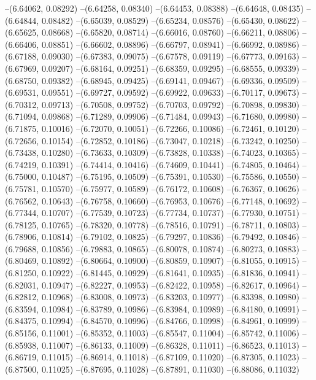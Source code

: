 --(6.64062, 0.08292)
--(6.64258, 0.08340)
--(6.64453, 0.08388)
--(6.64648, 0.08435)
--(6.64844, 0.08482)
--(6.65039, 0.08529)
--(6.65234, 0.08576)
--(6.65430, 0.08622)
--(6.65625, 0.08668)
--(6.65820, 0.08714)
--(6.66016, 0.08760)
--(6.66211, 0.08806)
--(6.66406, 0.08851)
--(6.66602, 0.08896)
--(6.66797, 0.08941)
--(6.66992, 0.08986)
--(6.67188, 0.09030)
--(6.67383, 0.09075)
--(6.67578, 0.09119)
--(6.67773, 0.09163)
--(6.67969, 0.09207)
--(6.68164, 0.09251)
--(6.68359, 0.09295)
--(6.68555, 0.09339)
--(6.68750, 0.09382)
--(6.68945, 0.09425)
--(6.69141, 0.09467)
--(6.69336, 0.09509)
--(6.69531, 0.09551)
--(6.69727, 0.09592)
--(6.69922, 0.09633)
--(6.70117, 0.09673)
--(6.70312, 0.09713)
--(6.70508, 0.09752)
--(6.70703, 0.09792)
--(6.70898, 0.09830)
--(6.71094, 0.09868)
--(6.71289, 0.09906)
--(6.71484, 0.09943)
--(6.71680, 0.09980)
--(6.71875, 0.10016)
--(6.72070, 0.10051)
--(6.72266, 0.10086)
--(6.72461, 0.10120)
--(6.72656, 0.10154)
--(6.72852, 0.10186)
--(6.73047, 0.10218)
--(6.73242, 0.10250)
--(6.73438, 0.10280)
--(6.73633, 0.10309)
--(6.73828, 0.10338)
--(6.74023, 0.10365)
--(6.74219, 0.10391)
--(6.74414, 0.10416)
--(6.74609, 0.10441)
--(6.74805, 0.10464)
--(6.75000, 0.10487)
--(6.75195, 0.10509)
--(6.75391, 0.10530)
--(6.75586, 0.10550)
--(6.75781, 0.10570)
--(6.75977, 0.10589)
--(6.76172, 0.10608)
--(6.76367, 0.10626)
--(6.76562, 0.10643)
--(6.76758, 0.10660)
--(6.76953, 0.10676)
--(6.77148, 0.10692)
--(6.77344, 0.10707)
--(6.77539, 0.10723)
--(6.77734, 0.10737)
--(6.77930, 0.10751)
--(6.78125, 0.10765)
--(6.78320, 0.10778)
--(6.78516, 0.10791)
--(6.78711, 0.10803)
--(6.78906, 0.10814)
--(6.79102, 0.10825)
--(6.79297, 0.10836)
--(6.79492, 0.10846)
--(6.79688, 0.10856)
--(6.79883, 0.10865)
--(6.80078, 0.10874)
--(6.80273, 0.10883)
--(6.80469, 0.10892)
--(6.80664, 0.10900)
--(6.80859, 0.10907)
--(6.81055, 0.10915)
--(6.81250, 0.10922)
--(6.81445, 0.10929)
--(6.81641, 0.10935)
--(6.81836, 0.10941)
--(6.82031, 0.10947)
--(6.82227, 0.10953)
--(6.82422, 0.10958)
--(6.82617, 0.10964)
--(6.82812, 0.10968)
--(6.83008, 0.10973)
--(6.83203, 0.10977)
--(6.83398, 0.10980)
--(6.83594, 0.10984)
--(6.83789, 0.10986)
--(6.83984, 0.10989)
--(6.84180, 0.10991)
--(6.84375, 0.10994)
--(6.84570, 0.10996)
--(6.84766, 0.10998)
--(6.84961, 0.10999)
--(6.85156, 0.11001)
--(6.85352, 0.11003)
--(6.85547, 0.11004)
--(6.85742, 0.11006)
--(6.85938, 0.11007)
--(6.86133, 0.11009)
--(6.86328, 0.11011)
--(6.86523, 0.11013)
--(6.86719, 0.11015)
--(6.86914, 0.11018)
--(6.87109, 0.11020)
--(6.87305, 0.11023)
--(6.87500, 0.11025)
--(6.87695, 0.11028)
--(6.87891, 0.11030)
--(6.88086, 0.11032)
